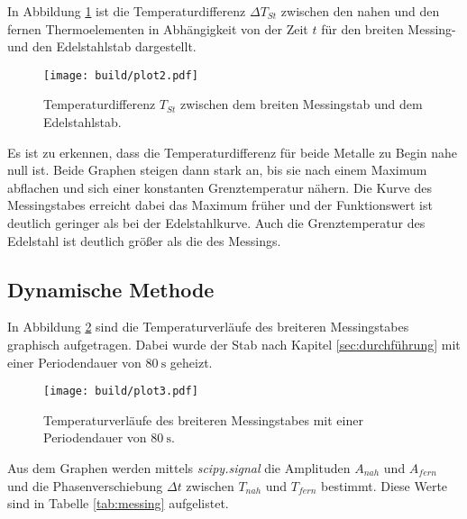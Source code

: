 \noindent
In Abbildung \ref{fig:diff} ist die Temperaturdifferenz $\Delta T_{St}$ zwischen den nahen und den fernen Thermoelementen in Abhängigkeit 
von der Zeit $t$ für den breiten Messing- und den Edelstahlstab dargestellt. 

\begin{figure}[H]
    \centering
    \texttt{[image: build/plot2.pdf]}
    \caption{Temperaturdifferenz $T_{St}$ zwischen dem breiten Messingstab und dem Edelstahlstab.}
    \label{fig:diff}
\end{figure}

\noindent
Es ist zu erkennen, dass die Temperaturdifferenz für beide Metalle zu Begin nahe null ist. Beide Graphen steigen dann stark an, bis sie 
nach einem Maximum abflachen und sich einer konstanten Grenztemperatur nähern. Die Kurve des Messingstabes erreicht dabei das Maximum früher 
und der Funktionswert ist deutlich geringer als bei der Edelstahlkurve. Auch die Grenztemperatur des Edelstahl ist deutlich größer als die des
Messings. 

\subsection{Dynamische Methode}
\label{sec:ad}
In Abbildung \ref{fig:messing} sind die Temperaturverläufe des breiteren Messingstabes graphisch aufgetragen. Dabei wurde der Stab nach Kapitel
\ref{sec:durchführung} mit einer Periodendauer von $\SI{80}{\second}$ geheizt.

\begin{figure}[H]
    \centering
    \texttt{[image: build/plot3.pdf]}
    \caption{Temperaturverläufe des breiteren Messingstabes mit einer Periodendauer von $\SI{80}{\second}$.}
    \label{fig:messing}
\end{figure}
\noindent

Aus dem Graphen werden mittels \textit{scipy.signal} \cite{scipy} die Amplituden $A_{nah}$ und $A_{fern}$ und die Phasenverschiebung $\Delta t$ zwischen 
$T_{nah}$ und $T_{fern}$ bestimmt. Diese Werte sind in Tabelle \ref{tab:messing}  aufgelistet. 

